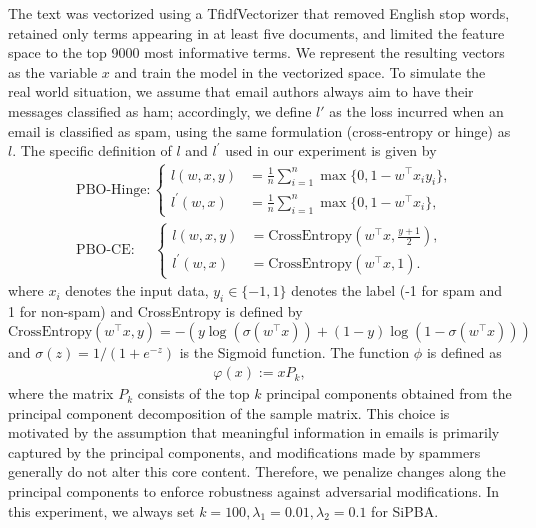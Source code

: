 \documentclass{article}
\begin{document}
    The text was vectorized using a TfidfVectorizer that removed English stop words, retained only
    terms appearing in at least five documents, and limited the feature space to the top 9000 most informative terms.
    We represent the resulting vectors as the variable $x$ and train the model in the vectorized space.
    To simulate the real world situation, we assume that email authors always aim to have their messages classified as ham; accordingly, we define \(l'\) as the loss incurred when an email is classified as spam, using the same formulation (cross‐entropy or hinge) as \(l\).  The specific definition of $l$ and $l^{\prime}$ used in our experiment is given by
    \begin{align*}
    &\text{PBO-Hinge}:\begin{cases}
        l(w,x,y) &= \frac{1}{n}\sum_{i=1}^{n}\max\{0, 1 - w^{\top} x_i y_i\},\\
        l^{\prime}(w,x) &= \frac{1}{n}\sum_{i=1}^{n}\max\{0, 1 - w^{\top} x_i\},
    \end{cases}\\
    &\text{PBO-CE:}\;\;\;\;\;\begin{cases}
        l(w,x,y) &= \text{CrossEntropy}(w^{\top}x,\frac{y+1}{2}), \\
        l^{\prime}(w,x) &=\text{CrossEntropy}(w^{\top}x,1).
    \end{cases}
    \end{align*}
    where $x_i$ denotes the input data, $y_{i}\in\{-1,1\}$ denotes the label (-1 for spam and 1 for non-spam) and CrossEntropy is defined by $\text{CrossEntropy}(w^{\top}x, y) = - \left( y \log(\sigma(w^{\top}x)) + (1 - y) \log(1 - \sigma(w^{\top}x)) \right)$ and $\sigma(z)=1/(1+e^{-z})$ is the Sigmoid function. The function $\phi$ is defined as  
	\begin{align*}  
		\varphi(x) := xP_{k},  
	\end{align*}  
    where the matrix $P_k$ consists of the top $k$ principal components obtained from the principal component decomposition of the sample matrix. This choice is motivated by the assumption that meaningful information in emails is primarily captured by the principal components, and modifications made by spammers generally do not alter this core content. Therefore, we penalize changes along the principal components to enforce robustness against adversarial modifications. In this experiment, we always set $k=100, \lambda_1=0.01,\lambda_2=0.1$ for SiPBA. 
\end{document}
